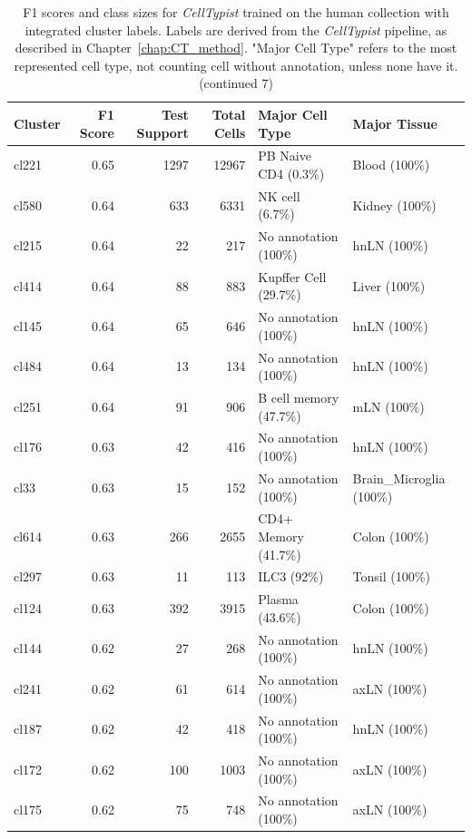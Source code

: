 \begin{table}[ht!]
\scriptsize
\caption[F1 scores and class sizes for \textit{CellTypist} trained on the human collection with integrated cluster labels (continued 7)]{F1 scores and class sizes for \textit{CellTypist} trained on the human collection with integrated cluster labels. Labels are derived from the \textit{CellTypist} pipeline, as described in Chapter~\ref{chap:CT_method}. "Major Cell Type" refers to the most represented cell type, not counting cell without annotation, unless none have it. (continued 7)}
\centering
\label{table:tab_HAmodelclust7}
\begin{tabular}{lrrrll}
  \toprule
Cluster & F1 Score & Test Support & Total Cells & Major Cell Type & Major Tissue \\ 
  \midrule
  cl221 & 0.65 & 1297 & 12967 & PB Naive CD4  (0.3\%) & Blood (100\%) \\ 
  cl580 & 0.64 & 633 & 6331 & NK cell (6.7\%) & Kidney (100\%) \\ 
  cl215 & 0.64 &  22 & 217 & No annotation (100\%) & hnLN (100\%) \\ 
  cl414 & 0.64 &  88 & 883 & Kupffer Cell (29.7\%) & Liver (100\%) \\ 
  cl145 & 0.64 &  65 & 646 & No annotation (100\%) & hnLN (100\%) \\ 
  cl484 & 0.64 &  13 & 134 & No annotation (100\%) & hnLN (100\%) \\ 
  cl251 & 0.64 &  91 & 906 & B cell memory (47.7\%) & mLN (100\%) \\ 
  cl176 & 0.63 &  42 & 416 & No annotation (100\%) & hnLN (100\%) \\ 
  cl33 & 0.63 &  15 & 152 & No annotation (100\%) & Brain\_Microglia (100\%) \\ 
  cl614 & 0.63 & 266 & 2655 & CD4+ Memory (41.7\%) & Colon (100\%) \\ 
  cl297 & 0.63 &  11 & 113 & ILC3 (92\%) & Tonsil (100\%) \\ 
  cl124 & 0.63 & 392 & 3915 & Plasma (43.6\%) & Colon (100\%) \\ 
  cl144 & 0.62 &  27 & 268 & No annotation (100\%) & hnLN (100\%) \\ 
  cl241 & 0.62 &  61 & 614 & No annotation (100\%) & axLN (100\%) \\ 
  cl187 & 0.62 &  42 & 418 & No annotation (100\%) & hnLN (100\%) \\ 
  cl172 & 0.62 & 100 & 1003 & No annotation (100\%) & axLN (100\%) \\ 
  cl175 & 0.62 &  75 & 748 & No annotation (100\%) & axLN (100\%) \\ 

\end{tabular}
\end{table}
